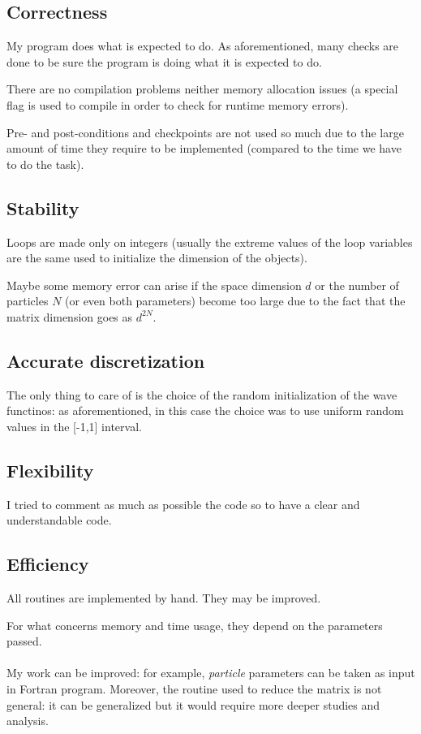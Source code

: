\documentclass[12pt, a4paper, notitlepage]{report}
\begin{document}
\subsection*{Correctness}

My program does what is expected to do. As aforementioned, many checks are done to be sure the program is doing what it is expected to do.

There are no compilation problems neither memory allocation issues (a special flag is used to compile in order to check for runtime memory errors).

Pre- and post-conditions and checkpoints are not used so much due to the large amount of time they require to be implemented (compared to the time we have to do the task).


\subsection*{Stability}

Loops are made only on integers (usually the extreme values of the loop variables are the same used to initialize the dimension of the objects).

Maybe some memory error can arise if the space dimension $d$ or the number of particles $N$ (or even both parameters) become too large due to the fact that the matrix dimension goes as $d^{2N}$.


\subsection*{Accurate discretization}

The only thing to care of is the choice of the random initialization of the wave functinos: as aforementioned, in this case the choice was to use uniform random values in the [-1,1] interval.


\subsection*{Flexibility}

I tried to comment as much as possible the code so to have a clear and understandable code.

\subsection*{Efficiency}

All routines are implemented by hand. They may be improved.

For what concerns memory and time usage, they depend on the parameters passed.\\ \\

My work can be improved: for example, \textit{particle} parameters can be taken as input in Fortran program. Moreover, the routine used to reduce the matrix is not general: it can be generalized but it would require more deeper studies and analysis.
\end{document}
